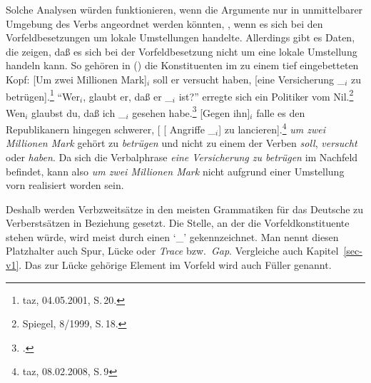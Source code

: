 Solche Analysen würden funktionieren, wenn die Argumente nur in unmittelbarer Umgebung des Verbs angeordnet
werden könnten, \dash, wenn es sich bei den Vorfeldbesetzungen um lokale Umstellungen handelte.
Allerdings gibt es Daten, die zeigen, daß es sich bei der Vorfeldbesetzung nicht um eine lokale Umstellung handeln kann.
So gehören in () die Konstituenten im \vf zu einem tief eingebetteten Kopf:
\eal
\ex\label{bsp-um-zwei-millionen}
{}[Um zwei Millionen Mark]$_i$ soll er versucht haben, [eine Versicherung \_$_i$ zu betrügen].\footnote{
         taz, 04.05.2001, S.\,20.
}
\ex
"`Wer$_i$, glaubt er, daß er \_$_i$ ist?"' erregte sich ein Politiker vom Nil.\footnote{
        Spiegel, 8/1999, S.\,18.
}
\ex Wen$_i$ glaubst du, daß ich \_$_i$ gesehen habe.\footnote{
    .
    }
\ex {}[Gegen ihn]$_i$ falle es den Republikanern hingegen schwerer, [ [ Angriffe \_$_i$] zu lancieren].\footnote{
  taz, 08.02.2008, S.\,9
}
\zl
\emph{um zwei Millionen Mark} gehört zu \emph{betrügen} und nicht zu einem der Verben \emph{soll}, \emph{versucht}
oder \emph{haben}. Da sich die Verbalphrase \emph{eine Versicherung zu betrügen} im Nachfeld befindet, kann
also \emph{um zwei Millionen Mark} nicht aufgrund einer Umstellung vorn realisiert worden sein.

Deshalb werden Verbzweitsätze in den meisten Grammatiken für das Deutsche zu Verberstsätzen in Beziehung gesetzt.
Die Stelle, an der die Vorfeldkonstituente stehen würde, wird meist durch einen `\_' gekennzeichnet. Man nennt
diesen Platzhalter auch Spur, Lücke oder \emph{Trace} bzw.\ \emph{Gap}.
Vergleiche auch Kapitel~\ref{sec-v1}.
Das zur Lücke gehörige Element im Vorfeld wird auch Füller genannt.

